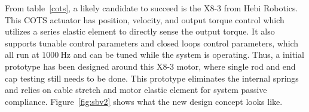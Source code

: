 \begin{table}[tbhp]
\centering
\caption{List of companies that sell COTS actuators to be integrated into \SB{} v2. This is not an exhaustive list.}
\label{cots}
\end{table}

From table~\ref{cots}, a likely candidate to succeed is the X8-3 from Hebi Robotics.
This COTS actuator has position, velocity, and output torque control which utilizes a series elastic element to directly sense the output torque.
It also supports tunable control parameters and closed loops control parameters, which all run at \(\SI{1000}{\hertz}\) and can be tuned while the system is operating.
Thus, a initial prototype has been designed around this X8-3 motor, where single rod and end cap testing still needs to be done.
This prototype eliminates the internal springs and relies on cable stretch and motor elastic element for system passive compliance.
Figure~\ref{fig:sbv2} shows what the new design concept looks like.

